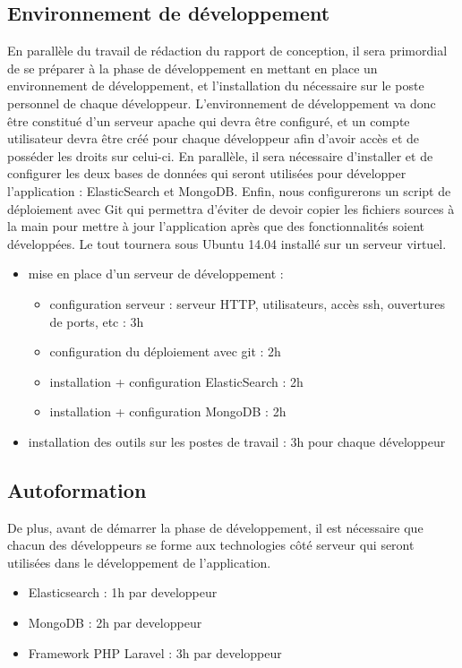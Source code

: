     \subsection{Environnement de développement}
    \label{subsec:env_dev}
        En parallèle du travail de rédaction du rapport de conception, il sera primordial de se préparer à la phase de développement en mettant en place un environnement de développement, et l'installation du nécessaire sur le poste personnel de chaque développeur. L'environnement de développement va donc être constitué d'un serveur apache qui devra être configuré, et un compte utilisateur devra être créé pour chaque développeur afin d'avoir accès et de posséder les droits sur celui-ci. En parallèle, il sera nécessaire d'installer et de configurer les deux bases de données qui seront utilisées pour développer l'application : ElasticSearch et MongoDB. Enfin, nous configurerons un script de déploiement avec Git qui permettra d'éviter de devoir copier les fichiers sources à la main pour mettre à jour l'application après que des fonctionnalités soient développées. Le tout tournera sous Ubuntu 14.04 installé sur un serveur virtuel.
        \begin{itemize}
            \item mise en place d'un serveur de développement :
            \begin{itemize}
                \item configuration serveur : serveur HTTP, utilisateurs, accès ssh, ouvertures de ports, etc : 3h
                \item configuration du déploiement avec git : 2h
                \item installation + configuration ElasticSearch : 2h
                \item installation + configuration MongoDB : 2h
            \end{itemize}
            \item installation des outils sur les postes de travail : 3h pour chaque développeur
        \end{itemize}

    \subsection{Autoformation}
        De plus, avant de démarrer la phase de développement, il est nécessaire que chacun des développeurs se forme aux technologies côté serveur qui seront utilisées dans le développement de l'application.
        \begin{itemize}
            \item Elasticsearch : 1h par developpeur
            \item MongoDB : 2h par developpeur
            \item Framework PHP Laravel : 3h par developpeur
        \end{itemize}

